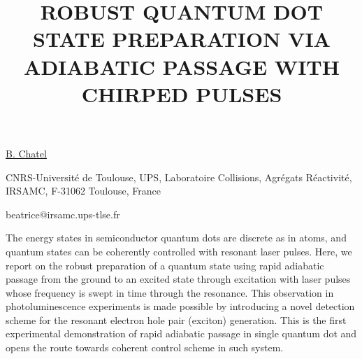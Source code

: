 \title{ROBUST QUANTUM DOT STATE PREPARATION VIA ADIABATIC PASSAGE WITH CHIRPED PULSES}

\underline{B. Chatel} 

{\normalsize{\vspace{-4mm}
CNRS-Universit\'e de Toulouse, UPS, Laboratoire Collisions, Agr\'egats R\'eactivit\'e, IRSAMC, F-31062 Toulouse, France

\email beatrice@irsamc.ups-tlse.fr}}

The energy states in semiconductor quantum dots are discrete as in atoms, and quantum
states can be coherently controlled with resonant laser pulses.  Here, we report on the robust preparation of a quantum state using  rapid adiabatic passage from the ground to an excited state through excitation with laser pulses whose frequency is swept in time through the resonance. This observation in photoluminescence experiments is made possible by introducing a novel detection scheme for the resonant electron hole pair (exciton) generation. This is the first experimental demonstration of rapid adiabatic passage in single quantum dot and opens the route towards coherent control scheme in such system.

\vspace{\baselineskip} 